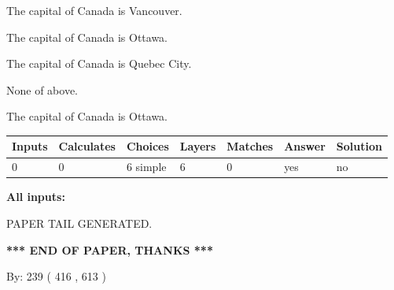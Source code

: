 \documentclass[12pt]{article}
\begin{document}
 
The capital of Canada is Vancouver.
 
 
The capital of Canada is Ottawa.
 
 
The capital of Canada is Quebec City.
 
 
 None of above.
 
 
\noindent{}
 
 
The capital of Canada is Ottawa.
 
 
\noindent{}
 
 
   
   
   
   
\noindent\begin{tabular}{|l|l|l|l|l|l|l|}
 \hline
Inputs & Calculates & Choices & Layers & Matches & Answer & Solution \\ \hline
 0  & 
 0  & 
 6
  simple  
  & 
 6  & 
 0  & 
  yes & 
  no 
  \\ \hline
 \end{tabular}
   
   
   
   
\noindent{}
   
   
   
   
\noindent\vspace{0.1in}\hspace{-0.08in} {\textbf{\Large{All inputs: }}}
   
   
   
   
   
   
 \vspace{0.2in}
 
   
   
\vspace{2.0in} PAPER TAIL GENERATED.
   
   
   
   
\vspace{1.0in} 
{\textbf{\large{ *** END OF PAPER, THANKS *** }}} 
   
   
\hspace{1.0in} By: 
 239 ( 416 ,  613 )
   
   
   
   
\newpage 
\setcounter{page}{ 
   563001 } 
   
\end{document}
